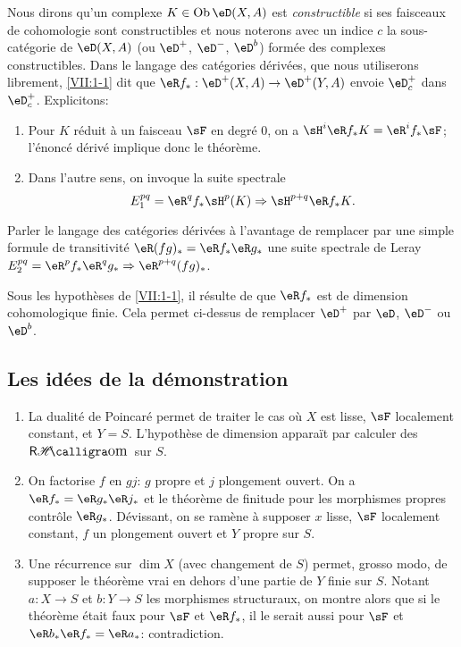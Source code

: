 Nous dirons qu'un complexe $K\in\ob\eD(X,A)$ est \emph{constructible} si ses 
faisceaux de cohomologie sont constructibles et nous noterons avec un indice 
$c$ la sous-catégorie de $\eD(X,A)$ (ou $\eD^+$, $\eD^-$, $\eD^b$) formée 
des complexes constructibles. Dans le langage des catégories dérivées, 
que nous utiliserons librement, \ref{VII:1-1} dit que 
$\eR f_\ast:\eD^+(X,A) \to \eD^+(Y,A)$ envoie $\eD_c^+$ dans $\eD_c^+$. 
Explicitons: 
\begin{enumerate}[\indent a)]
  \item Pour $K$ réduit à un faisceau $\sF$ en degré $0$, on a 
    $\sH^i\eR f_\ast K = \eR^i f_\ast \sF$; l'énoncé dérivé implique 
    donc le théorème. 
  \item Dans l'autre sens, on invoque la suite spectrale 
    \[
      E_1^{p q} = \eR^q f_\ast \sH^p(K) \Rightarrow \sH^{p+q} \eR f_\ast K \text{.} 
    \]
\end{enumerate}

Parler le langage des catégories dérivées à l'avantage de remplacer par 
une simple formule de transitivité $\eR(f g)_\ast = \eR f_\ast \eR g_\ast$ 
une suite spectrale de Leray 
$E_2^{p q} = \eR^p f_\ast \eR^q g_\ast \Rightarrow \eR^{p+q} (f g)_\ast$. 

Sous les hypothèses de \ref{VII:1-1}, il résulte de \cite{sga4} que 
$\eR f_\ast$ est de dimension cohomologique finie. Cela permet ci-dessus de 
remplacer $\eD^+$ par $\eD$, $\eD^-$ ou $\eD^b$. 





\subsection{Les idées de la démonstration}\label{VII:1-4}
\begin{enumerate}[\indent a)]
  \item La dualité de Poincaré permet de traiter le cas où $X$ est 
    lisse, $\sF$ localement constant, et $Y=S$. L'hypothèse de dimension 
    appara\"it par calculer des $\rHom$ sur $S$.
  \item On factorise $f$ en $g j$: $g$ propre et $j$ plongement ouvert. On a 
    $\eR f_\ast = \eR g_\ast \eR j_\ast$ et le théorème de finitude pour 
    les morphismes propres contrôle $\eR g_\ast$. Dévissant, on se ramène 
    à supposer $x$ lisse, $\sF$ localement constant, $f$ un plongement ouvert 
    et $Y$ propre sur $S$. 
  \item Une récurrence sur $\dim X$ (avec changement de $S$) permet, grosso 
    modo, de supposer le théorème vrai en dehors d'une partie de $Y$ finie 
    sur $S$. Notant $a:X\to S$ et $b:Y\to S$ les morphismes structuraux, on 
    montre alors que si le théorème était faux pour $\sF$ et 
    $\eR f_\ast$, il le serait aussi pour $\sF$ et 
    $\eR b_\ast \eR f_\ast = \eR a_\ast$: contradiction. 
\end{enumerate}





